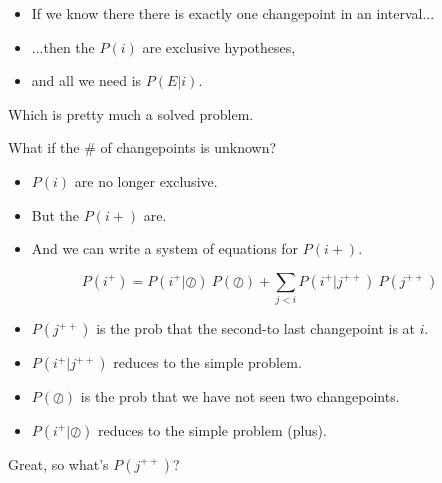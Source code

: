 \documentclass[pdf,allen]{prosper}
\renewcommand{\P}{\ P}
\newcommand{\jc}{\oslash}
\begin{document}
\begin{slide}{}

\begin{itemize}

\item If we know there there is exactly one
changepoint in an interval...

\item ...then the $P(i)$ are exclusive hypotheses,

\item and all we need is $P(E|i)$.

\end{itemize}

Which is pretty much a solved problem.

\end{slide}


\begin{slide}{}

What if the \# of changepoints is unknown?

\begin{itemize}

\item $P(i)$ are no longer exclusive.

\item But the $P(i+)$ are.

\item And we can write a system of equations for $P(i+)$.

\end{itemize}

\end{slide}


\begin{slide}{}

\[ P(i^+) = P(i^+ | \jc) \P(\jc) + \sum_{j<i} P(i^+ | j^{++}) \P(j^{++})  \]


\begin{itemize}

\item $P(j^{++})$ is the prob that the second-to last changepoint is at $i$.

\item $P(i^+ | j^{++})$ reduces to the simple problem.

\item $P(\jc)$ is the prob that we have not seen two changepoints.

\item $P(i^+ | \jc)$ reduces to the simple problem (plus).

\end{itemize}


Great, so what's $P(j^{++})$?

\end{slide}
\end{document}
